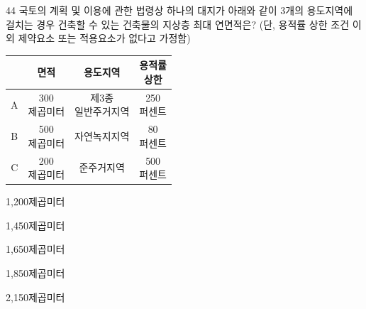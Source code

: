 \begin{question}{44}
국토의 계획 및 이용에 관한 법령상 하나의 대지가 아래와 같이 3개의 용도지역에 걸치는 경우 건축할 수 있는 건축물의 지상층 최대 연면적은? (단, 용적률 상한 조건 이외 제약요소 또는 적용요소가 없다고 가정함)
\begin{center}
\quad
{\small
\renewcommand{\arraystretch}{1.1}
\begin{tabular}{|c|c|c|c|}
\hline
 & 면적 & 용도지역 & \makecell{용적률\\상한} \\
\hline
A & \makecell{300\\제곱미터} & \makecell{제3종\\일반주거지역} & \makecell{250\\퍼센트} \\
\hline
B & \makecell{500\\제곱미터} & 자연녹지지역 & \makecell{80\\퍼센트} \\
\hline
C & \makecell{200\\제곱미터} & 준주거지역 & \makecell{500\\퍼센트} \\
\hline
\end{tabular}}
\end{center}
\begin{choices}
  \item 1,200제곱미터
  \item 1,450제곱미터
  \item 1,650제곱미터
  \item 1,850제곱미터
  \item 2,150제곱미터
\end{choices}
\end{question}
